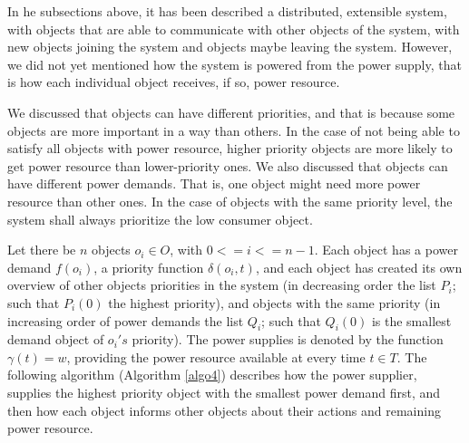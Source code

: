 \documentclass[../main/IoT.tex]{subfiles}
\begin{document}
In he subsections above, it has been described a distributed, extensible system, with objects that are able to communicate with other objects of the system, with new objects joining the system and objects maybe leaving the system. However, we did not yet mentioned how the system is powered from the power supply, that is how each individual object receives, if so, power resource.

We discussed that objects can have different priorities, and that is because some objects are more important in a way than others. In the case of not being able to satisfy all objects with power resource, higher priority objects are more likely to get power resource than lower-priority ones. We also discussed that objects can have different power demands. That is, one object might need more power resource than other ones. In the case of objects with the same priority level, the system shall always prioritize the low consumer object.

Let there be $n$ objects $o_{i}\in O$, with $0<=i<=n-1$. Each object has a power demand $f(o_{i})$, a priority function $\delta(o_{i}, t)$, and each object has created its own overview of other objects priorities in the system (in decreasing order the list $P_{i}$; such that $P_{i}(0)$ the highest priority), and objects with the same priority (in increasing order of power demands the list $Q_{i}$; such that $Q_{i}(0)$ is the smallest demand object of $o_{i}'s$ priority). The power supplies is denoted by the function $\gamma(t) = w$, providing the power resource available at every time $t \in T$. The following algorithm (Algorithm \ref{algo4}) describes how the power supplier, supplies the highest priority object with the smallest power demand first, and then how each object informs other objects about their actions and remaining power resource.
\end{document}
